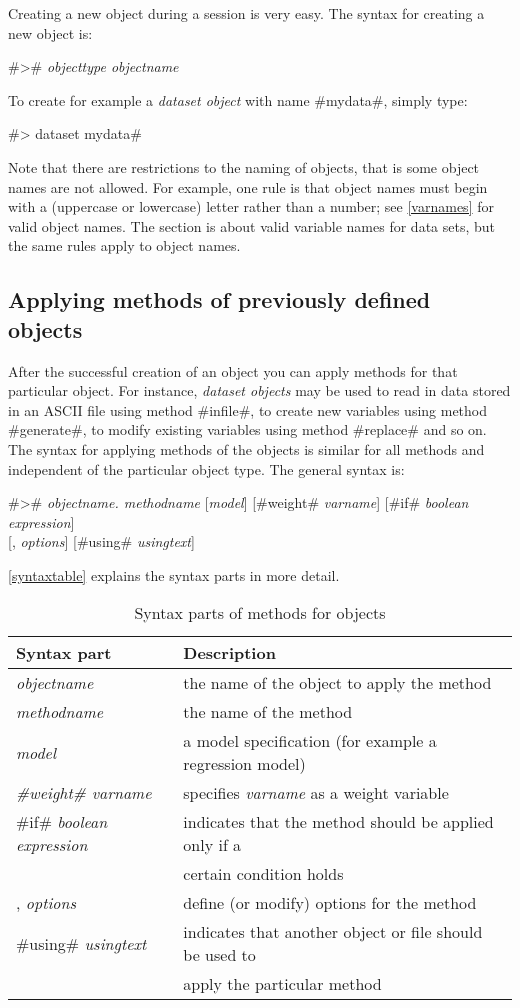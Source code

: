 Creating a new object during a session is very easy. The syntax for creating a new object is:

#># {\em objecttype objectname}

To create for example a {\em dataset object} with name #mydata#, simply type:

#> dataset mydata#

Note that there are restrictions to the naming of objects, that is
some object names are not allowed. For example, one rule is that
object names must begin with a (uppercase or lowercase) letter
rather than a number; see \autoref{varnames} for valid object
names. The section is about valid variable names for data sets,
but the same rules apply to object names.

\subsection{Applying methods of previously defined objects}

After the successful creation of an object you can apply methods
for that particular object. For instance, {\em dataset objects}
may be used to read in data stored in an ASCII file using method
#infile#, to create new variables using method #generate#, to modify
existing variables using method #replace# and so on. The syntax
for applying methods of the objects is similar for all methods
and independent of the particular object type. The general syntax is: \\
 

#># {\em objectname. methodname} [{\em model}] [#weight# {\em varname}] [#if# {\em boolean expression}]  \\
\hspace*{4.8cm}  [, {\em options}] [#using# {\em usingtext}]

\autoref{syntaxtable} explains the syntax parts in more detail.


\begin{table}[ht]
 \centering
\begin{tabular}{|l|l|}
\hline
Syntax part & Description \\
\hline
{\em objectname} & the name of the object to apply the method \\
{\em methodname} & the name of the method \\
{\em model} & a model specification (for example a regression model) \\
{\em #weight# varname} & specifies {\em varname} as a weight variable \\
#if# {\em boolean expression} & indicates that the method should be applied only if a \\
& certain condition holds \\
, {\em options} & define (or modify) options for the method \\
#using# {\em usingtext} & indicates that another object or file should be used to \\
& apply the particular method \\
\hline
\end{tabular}
{\em \caption{\label{syntaxtable}Syntax parts of methods for
objects}}
\end{table}


